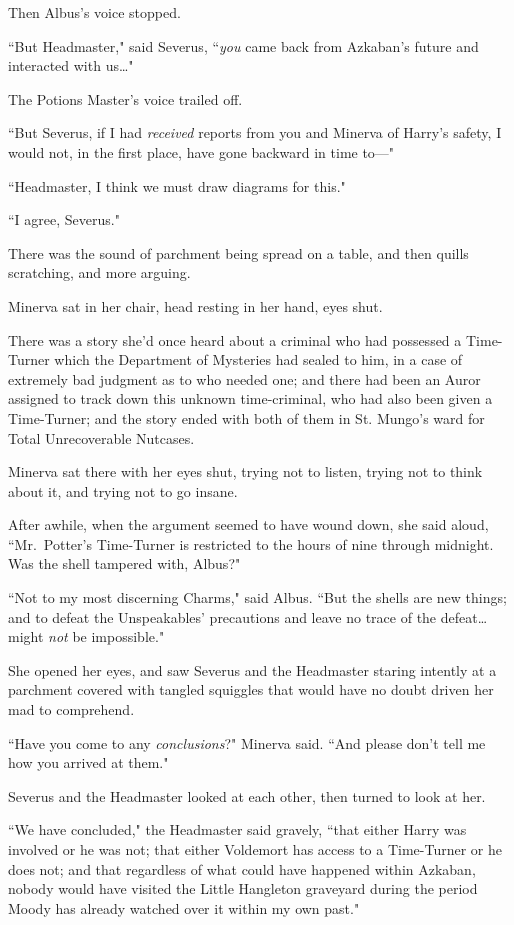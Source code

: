 Then Albus's voice stopped.

``But Headmaster," said Severus, ``\emph{you} came back from Azkaban's future and interacted with us{\ldots}"

The Potions Master's voice trailed off.

``But Severus, if I had \emph{received} reports from you and Minerva of Harry's safety, I would not, in the first place, have gone backward in time to---"

``Headmaster, I think we must draw diagrams for this."

``I agree, Severus."

There was the sound of parchment being spread on a table, and then quills scratching, and more arguing.

Minerva sat in her chair, head resting in her hand, eyes shut.

There was a story she'd once heard about a criminal who had possessed a Time-Turner which the Department of Mysteries had sealed to him, in a case of extremely bad judgment as to who needed one; and there had been an Auror assigned to track down this unknown time-criminal, who had also been given a Time-Turner; and the story ended with both of them in St. Mungo's ward for Total Unrecoverable Nutcases.

Minerva sat there with her eyes shut, trying not to listen, trying not to think about it, and trying not to go insane.

After awhile, when the argument seemed to have wound down, she said aloud, ``Mr.~Potter's Time-Turner is restricted to the hours of nine \pm through midnight. Was the shell tampered with, Albus?"

``Not to my most discerning Charms," said Albus. ``But the shells are new things; and to defeat the Unspeakables' precautions and leave no trace of the defeat{\ldots} might \emph{not} be impossible."

She opened her eyes, and saw Severus and the Headmaster staring intently at a parchment covered with tangled squiggles that would have no doubt driven her mad to comprehend.

``Have you come to any \emph{conclusions}?" Minerva said. ``And please don't tell me how you arrived at them."

Severus and the Headmaster looked at each other, then turned to look at her.

``We have concluded," the Headmaster said gravely, ``that either Harry was involved or he was not; that either Voldemort has access to a Time-Turner or he does not; and that regardless of what could have happened within Azkaban, nobody would have visited the Little Hangleton graveyard during the period Moody has already watched over it within my own past."

